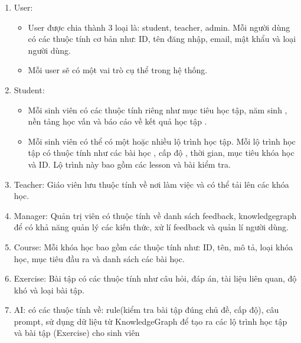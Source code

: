 \begin{enumerate}
    \item User:
    \begin{itemize}
        \item User được chia thành 3 loại là: student, teacher, admin. Mỗi người dùng có các thuộc tính cơ bản như: ID, tên đăng nhập, email, mật khẩu và loại người dùng.
        \item Mỗi user sẽ có một vai trò cụ thể trong hệ thống.
    \end{itemize}
    \item Student:
    \begin{itemize}
        \item Mỗi sinh viên có các thuộc tính riêng như mục tiêu học tập, năm sinh , nền tảng học vấn và báo cáo về kết quả học tập .
        \item Mỗi sinh viên có thể có một hoặc nhiều lộ trình học tập. Mỗi lộ trình học tập có thuộc tính như các bài học , cấp độ , thời gian, mục tiêu khóa học và ID. Lộ trình này bao gồm các lesson và bài kiểm tra.
    \end{itemize}
    \item Teacher: Giáo viên lưu thuộc tính về nơi làm việc và có thể tải lên các khóa học.
    \item Manager: Quản trị viên có thuộc tính về danh sách feedback, knowledgegraph để có khả năng quản lý các kiến thức, xử lí feedback và quản lí người dùng.
    \item Course: Mỗi khóa học bao gồm các thuộc tính như: ID, tên, mô tả, loại khóa học, mục tiêu đầu ra và danh sách các bài học.
    \item Exercise: Bài tập có các thuộc tính như câu hỏi, đáp án, tài liệu liên quan, độ khó và loại bài tập.
    \item AI: có các thuộc tính về: rule(kiểm tra bài tập đúng chủ đề, cấp độ), câu prompt, sử dụng dữ liệu từ KnowledgeGraph để tạo ra các lộ trình học tập và bài tập (Exercise) cho sinh viên 
\end{enumerate}
\newpage

